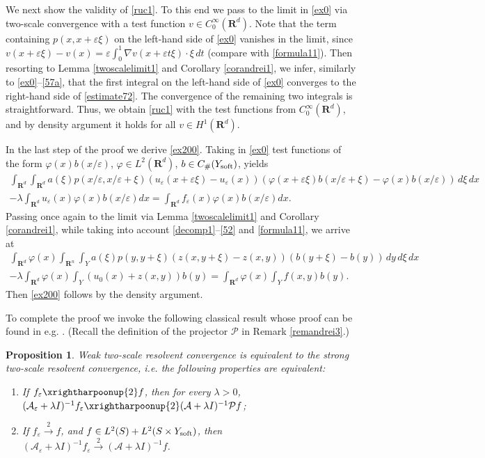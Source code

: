 \documentclass[11pt]{article}
\newcommand\e {\varepsilon}
\newcommand\soft{{\rm soft}}
\newcommand{\R}{\mathbf{R}}
\def\AA{\mathcal{A}}
\newtheorem{proposition}[theorem]{Proposition}
\theoremstyle{remark}
\begin{document}
We next show the validity of  \eqref{ruc1}. To this end  we pass to the limit in  \eqref{ex0} via two-scale convergence with a test function  $v \in C_0^\infty(\R^d) $. Note that the term containing $ p(x,x+\e\xi)$ on the left-hand  side of \eqref{ex0} vanishes in the limit, since $v(x+\e \xi)-v(x) = \e \int_0^1  \nabla v (x+\e    t \xi) \cdot\xi  \,dt$ (compare with \eqref{formula11}). Then resorting to Lemma \ref{twoscalelimit1} and Corollary \ref{corandrei1}, we infer, similarly to \eqref{ex0}--\eqref{57a}, that the first integral on the left-hand  side of \eqref{ex0} converges to the right-hand  side of \eqref{estimate72}.  The convergence of the remaining two integrals is straightforward. Thus, we obtain \eqref{ruc1} with the test functions from $C_0^\infty(\R^d)$, and by density argument it holds for all $v\in H^1(\R^d)$.

In the last step of the proof we derive \eqref{ex200}. Taking  in \eqref{ex0}  test functions of the form $\varphi(x)b(x/\e)$,  $\varphi \in L^2(\mathbf{R}^d)$, $b \in C_\#(Y_\soft)$, yields
\begin{multline}\label{rok1}
 \int_{\R^d} \int_{\R^d} a(\xi)p({x}/\e , {x/\e+\xi} )\left(u_\e (x+\e \xi)-u_\e (x) \right) \left(\varphi(x+\e \xi)b(x/\e+\xi )-\varphi(x)b({x}/\e ) \right)\,d\xi\,dx
 \\
 - \lambda \int_{\R^d}  u_\e  (x)\varphi(x)b({x}/\e ) dx=\int_{\R^d}  f_\e  (x) \varphi(x) b({x}/\e ) dx.
\end{multline}
Passing once again to the limit via Lemma \ref{twoscalelimit1} and Corollary \ref{corandrei1}, while taking into account \eqref{decomp1}--\eqref{52} and \eqref{formula11}, we arrive at
\begin{multline}\label{recal1}
\int_{\R^d}\varphi(x) \int_{\R^n}\int_{Y}  a(\xi)p(y, y+\xi)(z(x,y+\xi)-z(x,y))(b(y+\xi)-b(y)) \,dy\,d\xi\, dx
\\
-\lambda \int_{\R^d} \varphi(x) \int_{Y} (u_0(x)+z(x,y)) b(y)=\int_{\R^d} \varphi(x) \int_{Y} f(x,y) b(y). 	
\end{multline} 	
Then \eqref{ex200} follows by the density argument.



To complete the proof we invoke the following classical result whose proof can be found in e.g. \cite{Past}. (Recall the definition of the projector $\mathcal P$ in Remark \ref{remandrei3}.)

\begin{proposition}
	\label{prop510}
	Weak two-scale resolvent convergence is equivalent to the strong two-scale resolvent convergence, i.e. the following properties are equivalent:
	\begin{enumerate}
		\item If $f_\e \xrightharpoonup{2} f$, then for every $\lambda>0$, $(\AA_\e+ \lambda I)^{-1} f_\e \xrightharpoonup{2} (\AA+\lambda I)^{-1} \mathcal{P}f$;
		\item If $f_\e \xrightarrow{2} f$, and $f \in L^2(S)+L^2(S\times Y_\soft)$, then $(\AA_\e+ \lambda I)^{-1} f_\e \xrightarrow{2} (\AA+\lambda I)^{-1} f$.
	\end{enumerate}
\end{proposition} 	
\end{document}
